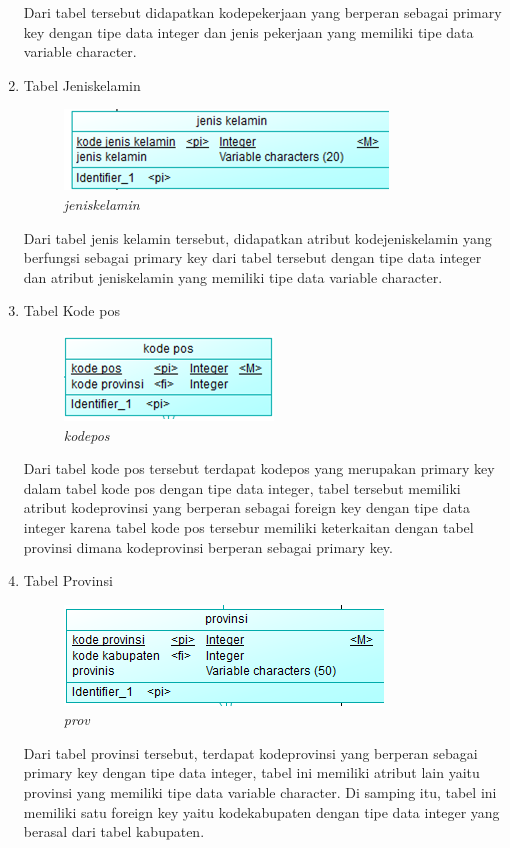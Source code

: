 \documentclass[12pt,a4paper,bahasa]{article}
\begin{document}
\begin{enumerate}
Dari tabel tersebut didapatkan  kodepekerjaan yang berperan sebagai primary key dengan tipe data integer dan jenis pekerjaan yang memiliki tipe data variable character.

	\item Tabel Jeniskelamin\\
\begin{figure}[!htbp]
\centering
\includegraphics[scale=1.5]{gambar/jeniskelamin.png}
\caption{\textit{jeniskelamin}}
\label{jeniskelamin}
\end{figure}	

Dari tabel jenis kelamin tersebut, didapatkan atribut kodejeniskelamin yang berfungsi sebagai primary key dari tabel tersebut dengan tipe data integer dan atribut jeniskelamin yang memiliki tipe data variable character.

	\item Tabel Kode pos\\
\begin{figure}[!htbp]
\centering
\includegraphics[scale=1.5]{gambar/kodepos.png}
\caption{\textit{kodepos}}
\label{kodepos}
\end{figure}	
Dari tabel kode pos tersebut terdapat kodepos yang merupakan primary key dalam tabel kode pos dengan tipe data integer, tabel tersebut memiliki atribut kodeprovinsi yang berperan sebagai foreign key dengan tipe data integer karena tabel kode pos tersebur memiliki keterkaitan dengan tabel provinsi dimana kodeprovinsi berperan sebagai primary key.
	
	\item Tabel Provinsi\\
\begin{figure}[!htbp]
\centering
\includegraphics[scale=1.5]{gambar/prov.png}
\caption{\textit{prov}}
\label{prov}
\end{figure}
Dari tabel provinsi tersebut, terdapat kodeprovinsi yang berperan sebagai primary key dengan tipe data integer, tabel ini memiliki atribut lain yaitu provinsi yang memiliki tipe data variable character. Di samping itu, tabel ini memiliki satu foreign key yaitu kodekabupaten dengan tipe data integer yang berasal dari tabel kabupaten.


\end{enumerate}
\end{document}

